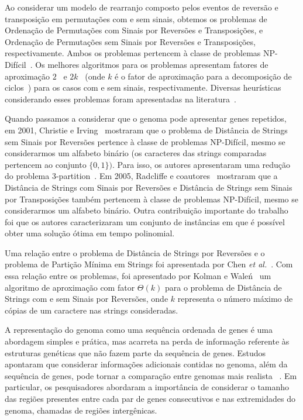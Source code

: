 Ao considerar um modelo de rearranjo composto pelos eventos de reversão e transposição em permutações com e sem sinais, obtemos os problemas de Ordenação de Permutações com Sinais por Reversões e Transposições, e Ordenação de Permutações sem Sinais por Reversões e Transposições, respectivamente. Ambos os problemas pertencem à classe de problemas NP-Difícil~\cite{2019b-oliveira-etal}. Os melhores algoritmos para os problemas apresentam fatores de aproximação $2$~\cite{1998-walter-etal} e $2k$~\cite{2008-rahman-etal} (onde $k$ é o fator de aproximação para a decomposição de ciclos~\cite{2013-chen}) para os casos com e sem sinais, respectivamente. Diversas heurísticas considerando esses problemas foram apresentadas na literatura~\cite{2014a-dias-etal,2018-brito-etal}.

Quando passamos a considerar que o genoma pode apresentar genes repetidos, em 2001, Christie e Irving~\cite{2001-christie-irving} mostraram que o problema de Distância de Strings sem Sinais por Reversões pertence à classe de problemas NP-Difícil, mesmo se considerarmos um alfabeto binário (os caracteres das strings comparadas pertencem ao conjunto $\{0,1\})$. Para isso, os autores apresentaram uma redução do problema 3-partition~\cite{1990-garey-johnson}. Em 2005, Radcliffe e coautores~\cite{2005-radcliffe-etal} mostraram que a Distância de Strings com Sinais por Reversões e Distância de Strings sem Sinais por Transposições também pertencem à classe de problemas NP-Difícil, mesmo se considerarmos um alfabeto binário. Outra contribuição importante do trabalho foi que os autores caracterizaram um conjunto de instâncias em que é possível obter uma solução ótima em tempo polinomial.

Uma relação entre o problema de Distância de Strings por Reversões e o problema de Partição Mínima em Strings foi apresentada por Chen \textit{et al.}~\cite{2005-chen-etal}. Com essa relação entre os problemas, foi apresentado por Kolman e Wale{\'n}~\cite{2006-kolman-walen} um algoritmo de aproximação com fator $\Theta(k)$ para o problema de Distância de Strings com e sem Sinais por Reversões, onde $k$ representa o número máximo de cópias de um caractere nas strings consideradas.

A representação do genoma como uma sequência ordenada de genes é uma abordagem simples e prática, mas acarreta na perda de informação referente às estruturas genéticas que não fazem parte da sequência de genes. Estudos apontaram que considerar informações adicionais contidas no genoma, além da sequência de genes, pode tornar a comparação entre genomas mais realista~\cite{2016a-biller-etal, 2016b-biller-etal} . Em particular, os pesquisadores abordaram a importância de considerar o tamanho das regiões presentes entre cada par de genes consecutivos e nas extremidades do genoma, chamadas de regiões intergênicas.

